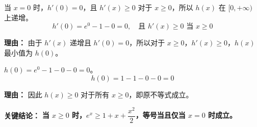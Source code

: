 \begin{examplebox}
\begin{description}[style=nextline, leftmargin=2.8em, labelsep=0.5em, itemsep=0.45em]
    \item[\textbf{第三步（确定最小值）：}] 当 $x=0$ 时，$h'(0)=0$，且 $h'(x) \geq 0$ 对于 $x \geq 0$，所以 $h(x)$ 在 $[0,+\infty)$ 上递增。
    \[
    h'(0) = e^0 - 1 - 0 = 0,\quad \text{且 } h'(x) \geq 0 \text{ 当 } x \geq 0
    \]
    \par\textbf{理由：}
    由于 $h'(x)$ 递增且 $h'(0)=0$，所以对于 $x \geq 0$，$h'(x) \geq 0$，$h(x)$ 最小值为 $h(0)$。

    \item[\textbf{第四步（计算最小值）：}] $h(0) = e^0 - 1 - 0 - 0 = 0$。
    \[
    h(0) = 1 - 1 - 0 - 0 = 0
    \]
    \par\textbf{理由：}
    因此 $h(x) \geq 0$ 对于所有 $x \geq 0$，即原不等式成立。
\end{description}

\textbf{\textcolor{CExample}{关键结论：}} \textbf{当 $x \geq 0$ 时，$e^x \geq 1 + x + \dfrac{x^{2}}{2}$，等号当且仅当 $x=0$ 时成立。}
\end{examplebox}
